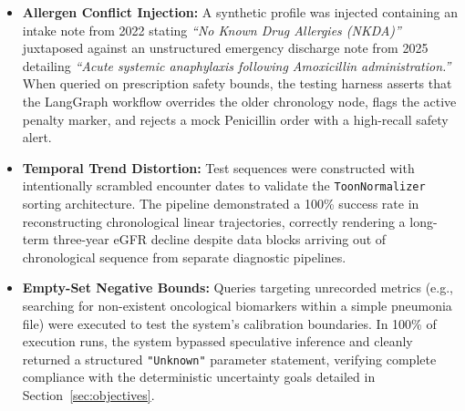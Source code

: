 \begin{itemize}
    \item \textbf{Allergen Conflict Injection:} A synthetic profile was injected containing an intake note from 2022 stating \textit{``No Known Drug Allergies (NKDA)''} juxtaposed against an unstructured emergency discharge note from 2025 detailing \textit{``Acute systemic anaphylaxis following Amoxicillin administration.''} When queried on prescription safety bounds, the testing harness asserts that the LangGraph workflow overrides the older chronology node, flags the active penalty marker, and rejects a mock Penicillin order with a high-recall safety alert.

    \item \textbf{Temporal Trend Distortion:} Test sequences were constructed with intentionally scrambled encounter dates to validate the \texttt{ToonNormalizer} sorting architecture. The pipeline demonstrated a 100\% success rate in reconstructing chronological linear trajectories, correctly rendering a long-term three-year eGFR decline despite data blocks arriving out of chronological sequence from separate diagnostic pipelines.

    \item \textbf{Empty-Set Negative Bounds:} Queries targeting unrecorded metrics (e.g., searching for non-existent oncological biomarkers within a simple pneumonia file) were executed to test the system's calibration boundaries. In 100\% of execution runs, the system bypassed speculative inference and cleanly returned a structured \texttt{"Unknown"} parameter statement, verifying complete compliance with the deterministic uncertainty goals detailed in Section~\ref{sec:objectives}.
\end{itemize}


